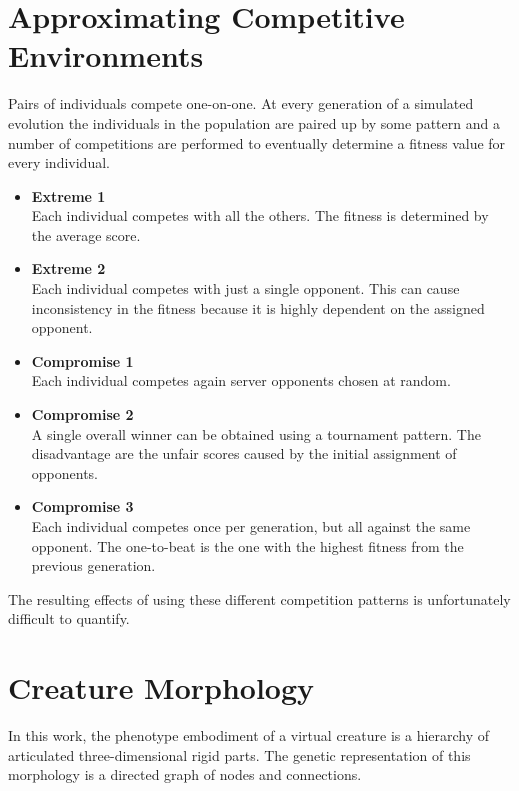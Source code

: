 \documentclass[../main.tex]{subfiles}
\begin{document}
\section{Approximating Competitive Environments}

Pairs of individuals compete one-on-one. At every generation of a simulated evolution the individuals in the population
are paired up by some pattern and a number of competitions are performed to eventually determine a fitness value for
every individual.

\begin{itemize}
	\item \textbf{Extreme 1} \\
	Each individual competes with all the others. The fitness is determined by the average score.
	\item \textbf{Extreme 2} \\
	Each individual competes with just a single opponent. This can cause inconsistency in the fitness because it is
	highly dependent on the assigned opponent.
	\item \textbf{Compromise 1} \\
	Each individual competes again server opponents chosen at random.
	\item \textbf{Compromise 2} \\
	A single overall winner can be obtained using a tournament pattern. The disadvantage are the unfair scores caused
	by the initial assignment of opponents.
	\item \textbf{Compromise 3} \\
	Each individual competes once per generation, but all against the same opponent. The one-to-beat is the one with
	the highest fitness from the previous generation.
\end{itemize}

The resulting effects of using these different competition patterns is unfortunately difficult to quantify.

\section{Creature Morphology}

In this work, the phenotype embodiment of a virtual creature is a hierarchy of articulated three-dimensional rigid
parts. The genetic representation of this morphology is a directed graph of nodes and connections.
\end{document}
